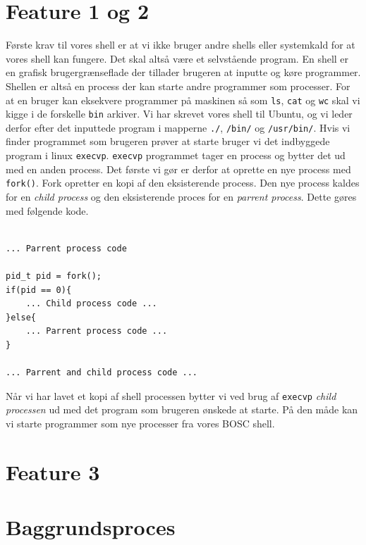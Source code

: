 \documentclass[danish]{report}
\begin{document}
\section{Feature 1 og 2}
Første krav til vores shell er at vi ikke bruger andre shells eller systemkald for at vores shell kan fungere. Det skal altså være et selvstående program. En shell er en grafisk brugergrænseflade der tillader brugeren at inputte og køre programmer. Shellen er altså en process der kan starte andre programmer som processer. For at en bruger kan eksekvere programmer på maskinen så som {\tt ls}, {\tt cat} og {\tt wc} skal vi kigge i de forskelle {\tt bin} arkiver. Vi har skrevet vores shell til Ubuntu, og vi leder derfor efter det inputtede program i mapperne {\tt ./}, {\tt /bin/} og {\tt /usr/bin/}. Hvis vi finder programmet som brugeren prøver at starte bruger vi det indbyggede program i linux {\tt execvp}. {\tt execvp} programmet tager en process og bytter det ud med en anden process. Det første vi gør er derfor at oprette en nye process med {\tt fork()}. Fork opretter en kopi af den eksisterende process. Den nye process kaldes for en \textit{child process} og den eksisterende proces for en \textit{parrent process}. Dette gøres med følgende kode.

\begin{lstlisting}

... Parrent process code

pid_t pid = fork();
if(pid == 0){
    ... Child process code ...
}else{
    ... Parrent process code ...
}

... Parrent and child process code ...

\end{lstlisting}

Når vi har lavet et kopi af shell processen bytter vi ved brug af {\tt execvp} \textit{child processen} ud med det program som brugeren ønskede at starte. På den måde kan vi starte programmer som nye processer fra vores BOSC shell.

\section{Feature 3}
\section{Baggrundsproces}
\end{document}
